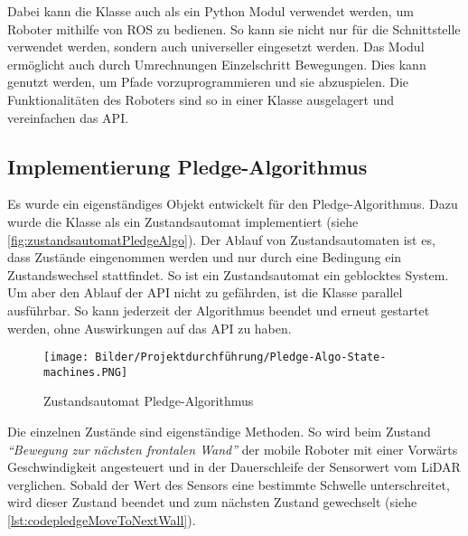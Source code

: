 

Dabei kann die Klasse auch als ein Python Modul verwendet werden, um Roboter mithilfe von ROS zu bedienen. So kann sie nicht nur für die Schnittstelle verwendet werden, sondern auch universeller eingesetzt werden. Das Modul ermöglicht auch durch Umrechnungen Einzelschritt Bewegungen. Dies kann genutzt werden, um Pfade vorzuprogrammieren und sie abzuspielen. Die Funktionalitäten des Roboters sind so in einer Klasse ausgelagert und vereinfachen das API.  

\subsection{Implementierung Pledge-Algorithmus}

Es wurde ein eigenständiges Objekt entwickelt für den Pledge-Algorithmus. Dazu wurde die Klasse als ein Zustandsautomat implementiert (siehe \autoref{fig:zustandsautomatPledgeAlgo}). Der Ablauf von Zustandsautomaten ist es, dass Zustände eingenommen werden und nur durch eine Bedingung ein Zustandswechsel stattfindet. So ist ein Zustandsautomat ein geblocktes System. Um aber den Ablauf der API nicht zu gefährden, ist die Klasse parallel ausführbar. So kann jederzeit der Algorithmus beendet und erneut gestartet werden, ohne Auswirkungen auf das API zu haben.  
\begin{figure}[H]
 \centering
 \texttt{[image: Bilder/Projektdurchführung/Pledge-Algo-State-machines.PNG]}
 \caption{Zustandsautomat Pledge-Algorithmus}
 \label{fig:zustandsautomatPledgeAlgo}
\end{figure}

Die einzelnen Zustände sind eigenständige Methoden. So wird beim Zustand \textit{“Bewegung zur nächsten frontalen Wand”} der mobile Roboter mit einer Vorwärts Geschwindigkeit angesteuert und in der Dauerschleife der Sensorwert vom LiDAR verglichen. Sobald der Wert des Sensors eine bestimmte Schwelle unterschreitet, wird dieser Zustand beendet und zum nächsten Zustand gewechselt (siehe \autoref{lst:codepledgeMoveToNextWall}).\\ 





